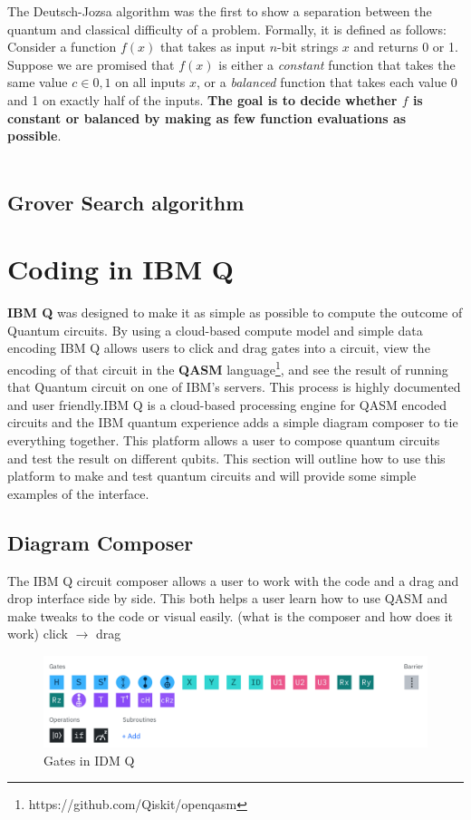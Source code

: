 \documentclass{article}
\newcommand{\qasm}{\footnote{https://github.com/Qiskit/openqasm}}
\begin{document}
    The Deutsch-Jozsa algorithm was the first to show a separation between the quantum and classical difficulty of a problem. Formally, it is defined as follows: Consider a function $f(x)$ that takes as input $n$-bit strings $x$ and returns 0  or 1. Suppose we are promised that $f(x)$ is either a \emph{constant} function that takes the same value $c \in {0,1}$ on all inputs $x$, or a \emph{balanced} function that takes each value 0 and 1 on exactly half of the inputs. \textbf{The goal is to decide whether $f$ is constant or balanced by making as few function evaluations as possible}. 
    \\
    \smallskip
    \\
    
    \subsection{Grover Search algorithm}
    
        
    
    
    
\section{Coding in IBM Q}
    \textbf{IBM Q} was designed to make it as simple as possible to compute the outcome of Quantum circuits. By using a cloud-based compute model and simple data encoding IBM Q allows users to click and drag gates into a circuit, view the encoding of that circuit in the \textbf{QASM} language\qasm, and see the result of running that Quantum circuit on one of IBM's servers. This process is highly documented and user friendly.IBM Q is a cloud-based processing engine for QASM encoded circuits and the IBM quantum experience adds a simple diagram composer to tie everything together. This platform allows a user to compose quantum circuits and test the result on different qubits. This section will outline how to use this platform to make and test quantum circuits and will provide some simple examples of the interface.
    
    \subsection{Diagram Composer}
        The IBM Q circuit composer allows a user to work with the code and a drag and drop interface side by side. This both helps a user learn how to use QASM and make tweaks to the code or visual easily. 
        (what is the composer and how does it work) click $\rightarrow$ drag
        \begin{figure}
            \centering
            \includegraphics[width=\linewidth]{Circuits/gates.png}
            \caption{Gates in IDM Q}
        \end{figure}
        
\end{document}
